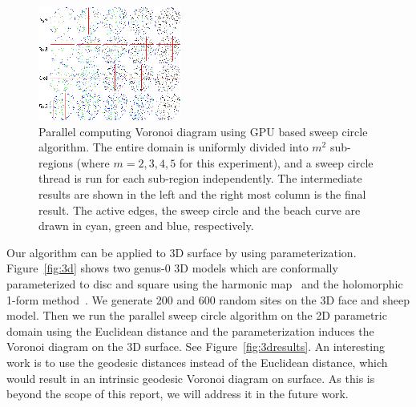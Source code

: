{{\begin{figure}[!htbp]
\vspace{-6mm}
\centering
\includegraphics[width=0.85\linewidth]{figs/sweepcircle/gpuSweepcircle.PNG}
\vspace{-0.1in}\caption{Parallel computing Voronoi diagram using GPU
based sweep circle algorithm. The entire domain is uniformly divided
into $m^2$ sub-regions (where $m=2,3,4,5$ for this experiment), and
a sweep circle thread is run for each sub-region independently. The
intermediate results are shown in the left and the right most column
is the final result. The active edges, the sweep circle and the
beach curve are drawn in cyan, green and blue, respectively.}
\label{fig:gpuSweepcircle}
\end{figure}

Our algorithm can be applied to 3D surface by using
parameterization. Figure~\ref{fig:3d} shows two genus-0 3D models
which are conformally parameterized to disc and square using the
harmonic map~\cite{DBLP:journals/tmi/GuWCTY04} and the holomorphic
1-form method~\cite{DBLP:conf/sgp/GuY03}. We generate 200 and 600
random sites on the 3D face and sheep model. Then we run the
parallel sweep circle algorithm on the 2D parametric domain using
the Euclidean distance and the parameterization induces the Voronoi
diagram on the 3D surface. See Figure~\ref{fig:3dresults}. An
interesting work is to use the geodesic distances instead of the
Euclidean distance, which would result in an intrinsic geodesic
Voronoi diagram on surface. As this is beyond the scope of this
report, we will address it in the future work.


}}

